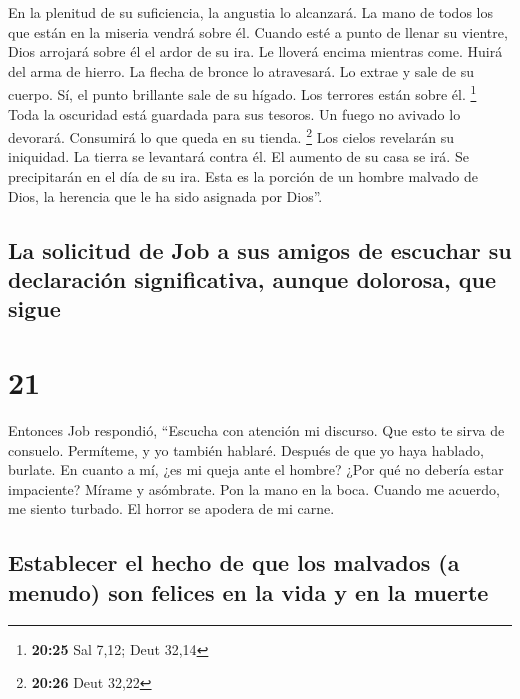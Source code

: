  En la plenitud de su suficiencia, la angustia lo
alcanzará. La mano de todos los que están en la miseria vendrá sobre él.
 Cuando esté a punto de llenar su vientre, Dios arrojará
sobre él el ardor de su ira. Le lloverá encima mientras come.
 Huirá del arma de hierro. La flecha de bronce lo
atravesará.  Lo extrae y sale de su cuerpo. Sí, el punto
brillante sale de su hígado. Los terrores están sobre él. \footnote{\textbf{20:25}
  Sal 7,12; Deut 32,14}  Toda la oscuridad está guardada
para sus tesoros. Un fuego no avivado lo devorará. Consumirá lo que
queda en su tienda. \footnote{\textbf{20:26} Deut 32,22} 
Los cielos revelarán su iniquidad. La tierra se levantará contra él.
 El aumento de su casa se irá. Se precipitarán en el día
de su ira.  Esta es la porción de un hombre malvado de
Dios, la herencia que le ha sido asignada por Dios''.

\hypertarget{la-solicitud-de-job-a-sus-amigos-de-escuchar-su-declaraciuxf3n-significativa-aunque-dolorosa-que-sigue}{%
\subsection{La solicitud de Job a sus amigos de escuchar su declaración
significativa, aunque dolorosa, que
sigue}\label{la-solicitud-de-job-a-sus-amigos-de-escuchar-su-declaraciuxf3n-significativa-aunque-dolorosa-que-sigue}}

\hypertarget{section-20}{%
\section{21}\label{section-20}}

 Entonces Job respondió,  ``Escucha con
atención mi discurso. Que esto te sirva de consuelo. 
Permíteme, y yo también hablaré. Después de que yo haya hablado,
burlate.  En cuanto a mí, ¿es mi queja ante el hombre?
¿Por qué no debería estar impaciente?  Mírame y asómbrate.
Pon la mano en la boca.  Cuando me acuerdo, me siento
turbado. El horror se apodera de mi carne.

\hypertarget{establecer-el-hecho-de-que-los-malvados-a-menudo-son-felices-en-la-vida-y-en-la-muerte}{%
\subsection{Establecer el hecho de que los malvados (a menudo) son
felices en la vida y en la
muerte}\label{establecer-el-hecho-de-que-los-malvados-a-menudo-son-felices-en-la-vida-y-en-la-muerte}}

